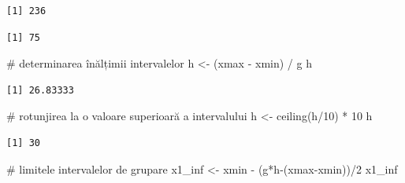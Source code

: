 \documentclass[
  11pt,
  b5paper,
  nottoc]{book}
\newenvironment{Shaded}{\begin{snugshade}}{\end{snugshade}}
\newcommand{\CommentTok}[1]{\textcolor[rgb]{0.37,0.37,0.37}{#1}}
\newcommand{\DecValTok}[1]{\textcolor[rgb]{0.68,0.00,0.00}{#1}}
\newcommand{\FunctionTok}[1]{\textcolor[rgb]{0.28,0.35,0.67}{#1}}
\newcommand{\NormalTok}[1]{\textcolor[rgb]{0.00,0.23,0.31}{#1}}
\newcommand{\OtherTok}[1]{\textcolor[rgb]{0.00,0.23,0.31}{#1}}
\newcommand{\SpecialCharTok}[1]{\textcolor[rgb]{0.37,0.37,0.37}{#1}}
\begin{document}
\begin{verbatim}
[1] 236
\end{verbatim}

\begin{Shaded}
\end{Shaded}

\begin{verbatim}
[1] 75
\end{verbatim}

\begin{Shaded}
\begin{Highlighting}[]
\CommentTok{\# determinarea înălțimii intervalelor}
\NormalTok{h }\OtherTok{\textless{}{-}}\NormalTok{ (xmax }\SpecialCharTok{{-}}\NormalTok{ xmin) }\SpecialCharTok{/}\NormalTok{ g}
\NormalTok{h}
\end{Highlighting}
\end{Shaded}

\begin{verbatim}
[1] 26.83333
\end{verbatim}

\begin{Shaded}
\begin{Highlighting}[]
\CommentTok{\# rotunjirea la o valoare superioară a intervalului}
\NormalTok{h }\OtherTok{\textless{}{-}} \FunctionTok{ceiling}\NormalTok{(h}\SpecialCharTok{/}\DecValTok{10}\NormalTok{) }\SpecialCharTok{*} \DecValTok{10}
\NormalTok{h}
\end{Highlighting}
\end{Shaded}

\begin{verbatim}
[1] 30
\end{verbatim}

\begin{Shaded}
\begin{Highlighting}[]
\CommentTok{\# limitele intervalelor de grupare}
\NormalTok{x1\_inf }\OtherTok{\textless{}{-}}\NormalTok{ xmin }\SpecialCharTok{{-}}\NormalTok{ (g}\SpecialCharTok{*}\NormalTok{h}\SpecialCharTok{{-}}\NormalTok{(xmax}\SpecialCharTok{{-}}\NormalTok{xmin))}\SpecialCharTok{/}\DecValTok{2}
\NormalTok{x1\_inf }
\end{Highlighting}
\end{Shaded}
\end{document}
